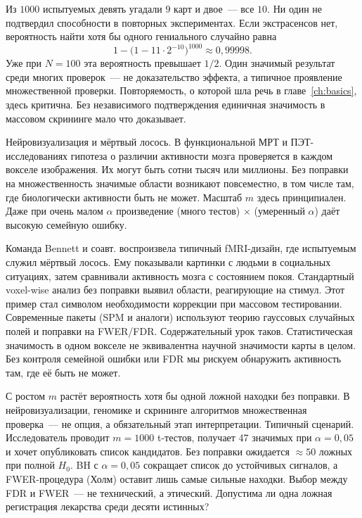 Из $1000$ испытуемых девять угадали $9$ карт и двое~--- все $10$. Ни один не подтвердил способности в повторных экспериментах.
Если экстрасенсов нет, вероятность найти хотя бы одного гениального случайно равна
\[ 1-\bigl(1-11\cdot 2^{-10}\bigr)^{1000}\approx 0{,}99998.
\]
Уже при $N=100$ эта вероятность превышает $1/2$.
Один значимый результат среди многих проверок~--- не доказательство эффекта, а типичное проявление множественной проверки.
Повторяемость, о которой шла речь в главе~\ref{ch:basics}, здесь критична. Без независимого подтверждения единичная значимость в массовом скрининге мало что доказывает.

Нейровизуализация и мёртвый лосось. В функциональной МРТ и ПЭТ-исследованиях гипотеза о различии активности мозга проверяется в каждом вокселе изображения. Их могут быть сотни тысяч или миллионы.
Без поправки на множественность значимые области возникают повсеместно, в том числе там, где биологически активности быть не может. Масштаб $m$ здесь принципиален. Даже при очень малом $\alpha$ произведение (много тестов) $\times$ (умеренный $\alpha$) даёт высокую семейную ошибку.

Команда Bennett и соавт. \citep{bennett2009} воспроизвела типичный fMRI-дизайн, где испытуемым служил мёртвый лосось. Ему показывали картинки с людьми в социальных ситуациях, затем сравнивали активность мозга с состоянием покоя.
Стандартный voxel-wise анализ без поправки выявил области, реагирующие на стимул.
Этот пример стал символом необходимости коррекции при массовом тестировании. Современные пакеты (SPM и аналоги) используют теорию гауссовых случайных полей и поправки на FWER/FDR.
Содержательный урок таков. Статистическая значимость в одном вокселе не эквивалентна научной значимости карты в целом. Без контроля семейной ошибки или FDR мы рискуем обнаружить активность там, где её быть не может.

С ростом $m$ растёт вероятность хотя бы одной ложной находки без поправки.
В нейровизуализации, геномике и скрининге алгоритмов множественная проверка~--- не опция, а обязательный этап интерпретации.
Типичный сценарий. Исследователь проводит $m=1000$ t-тестов, получает 47 значимых при $\alpha=0{,}05$ и хочет опубликовать список кандидатов. Без поправки ожидается $\approx 50$ ложных при полной $H_0$. BH с $\alpha=0{,}05$ сокращает список до устойчивых сигналов, а FWER-процедура (Холм) оставит лишь самые сильные находки.
Выбор между FDR и FWER~--- не технический, а этический. Допустима ли одна ложная регистрация лекарства среди десяти истинных?

